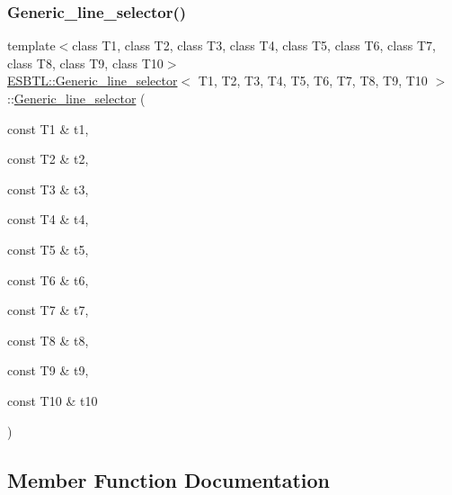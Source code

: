 \mbox{\label{classESBTL_1_1Generic__line__selector_aa044db1d64646e582a990d87ead787a1}} 
\subsubsection{\texorpdfstring{Generic\+\_\+line\+\_\+selector()}{Generic\_line\_selector()}\hspace{0.1cm}{\footnotesize\ttfamily [2/2]}}
{\footnotesize\ttfamily template$<$class T1, class T2, class T3, class T4, class T5, class T6, class T7, class T8, class T9, class T10$>$ \\
\hyperlink{classESBTL_1_1Generic__line__selector}{E\+S\+B\+T\+L\+::\+Generic\+\_\+line\+\_\+selector}$<$ T1, T2, T3, T4, T5, T6, T7, T8, T9, T10 $>$\+::\hyperlink{classESBTL_1_1Generic__line__selector}{Generic\+\_\+line\+\_\+selector} (\begin{DoxyParamCaption}\item[{const T1 \&}]{t1,  }\item[{const T2 \&}]{t2,  }\item[{const T3 \&}]{t3,  }\item[{const T4 \&}]{t4,  }\item[{const T5 \&}]{t5,  }\item[{const T6 \&}]{t6,  }\item[{const T7 \&}]{t7,  }\item[{const T8 \&}]{t8,  }\item[{const T9 \&}]{t9,  }\item[{const T10 \&}]{t10 }\end{DoxyParamCaption})\hspace{0.3cm}{\ttfamily [inline]}}



\subsection{Member Function Documentation}
\mbox{\label{classESBTL_1_1Generic__line__selector_aae6575ee43ada5b43d845bbc3a095f9d}} 
